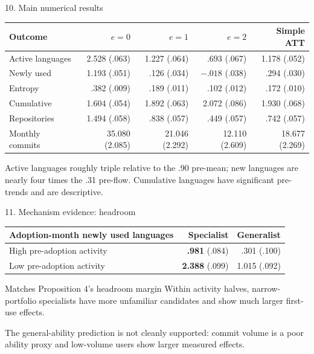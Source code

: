 \documentclass[aspectratio=169,10pt]{beamer}
\begin{document}
\begin{frame}{10. Main numerical results}
\centering\scriptsize
\begin{tabular}{lrrrr}
\toprule Outcome & $e=0$ & $e=1$ & $e=2$ & Simple ATT \\
\midrule
Active languages & 2.528 (.063) & 1.227 (.064) & .693 (.067) & 1.178 (.052) \\
Newly used & 1.193 (.051) & .126 (.034) & $-.018$ (.038) & .294 (.030) \\
Entropy & .382 (.009) & .189 (.011) & .102 (.012) & .172 (.010) \\
Cumulative & 1.604 (.054) & 1.892 (.063) & 2.072 (.086) & 1.930 (.068) \\
Repositories & 1.494 (.058) & .838 (.057) & .449 (.057) & .742 (.057) \\
Monthly commits & 35.080 (2.085) & 21.046 (2.292) & 12.110 (2.609) & 18.677 (2.269) \\
\bottomrule
\end{tabular}
\vspace{.9em}
\small Active languages roughly triple relative to the .90 pre-mean; new languages are nearly four times the .31 pre-flow. Cumulative languages have significant pre-trends and are descriptive.
\end{frame}

\begin{frame}{11. Mechanism evidence: headroom}
\centering\small
\begin{tabular}{lrr}
\toprule Adoption-month newly used languages & Specialist & Generalist \\
\midrule
High pre-adoption activity & \textbf{.981} (.084) & .301 (.100) \\
Low pre-adoption activity & \textbf{2.388} (.099) & 1.015 (.092) \\
\bottomrule
\end{tabular}
\vspace{.9em}
\begin{block}{Matches Proposition 4's headroom margin}
Within activity halves, narrow-portfolio specialists have more unfamiliar candidates and show much larger first-use effects.
\end{block}
The general-ability prediction is not cleanly supported: commit volume is a poor ability proxy and low-volume users show larger measured effects.
\end{frame}
\end{document}
